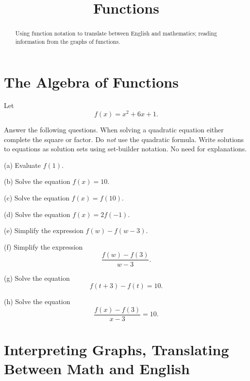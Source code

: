 \documentclass{ximera}
\title{Functions}
\begin{document}
\begin{abstract}
Using function notation to translate between English and mathematics; reading information from the graphs of functions.
\end{abstract}
\maketitle


\section{The Algebra of Functions}

\begin{question}  \label{Qersr4r}
Let
\[
     f(x) = x^2 + 6x + 1 .
\]

Answer the following questions. When solving a quadratic equation either complete the square or factor. Do \emph{not} use the quadratic formula. Write solutions to equations as solution sets using set-builder notation. No need for explanations. 

(a) Evaluate $f(1)$.

(b) Solve the equation $f(x)=10$.

(c) Solve the equation $f(x)=f(10)$.

(d) Solve the equation $f(x) = 2 f(-1)$.

(e) Simplify the expression $f(w) - f(w-3)$.

(f) Simplify the expression
\[
      \frac{f(w) - f(3)}{w-3} .
\]

(g) Solve the equation
\[
           f(t+3) - f(t) = 10 .
\]

(h) Solve the equation
\[
           \frac{f(x) - f(3)}{x-3} = 10.
\]
\end{question}



\section{Interpreting Graphs, Translating Between Math and English}
\end{document}
